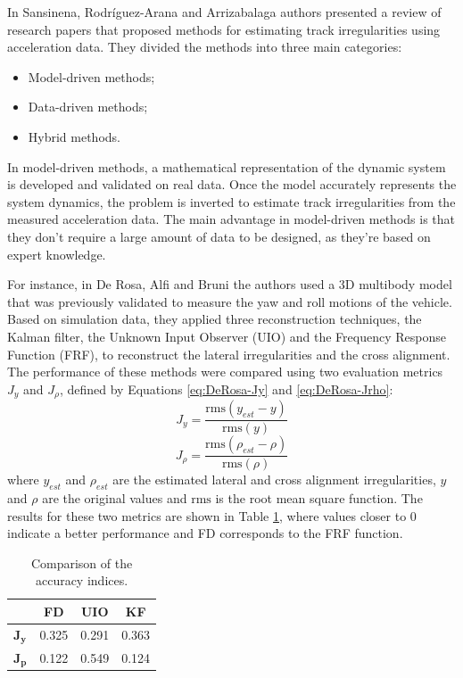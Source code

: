 In Sansinena, Rodríguez-Arana and Arrizabalaga \cite{Sansinena26032025} authors presented a review of research papers that proposed methods for estimating track irregularities using acceleration data. They divided the methods into three main categories:
\begin{itemize}
    \item Model-driven methods;
    \item Data-driven methods;
    \item Hybrid methods.
\end{itemize}

In model-driven methods, a mathematical representation of the dynamic system is developed and validated on real data. Once the model accurately represents the system dynamics, the problem is inverted to estimate track irregularities from the measured acceleration data. The main advantage in model-driven methods is that they don't require a large amount of data to be designed, as they're based on expert knowledge. 

For instance, in De Rosa, Alfi and Bruni \cite{DEROSA2019606} the authors used a 3D multibody model that was previously validated to measure the yaw and roll motions of the vehicle. Based on simulation data, they applied three reconstruction techniques, the Kalman filter, the Unknown Input Observer (UIO) and the Frequency Response Function (FRF), to reconstruct the lateral irregularities and the cross alignment. The performance of these methods were compared using two evaluation metrics $J_y$ and $J_\rho$, defined by Equations \ref{eq:DeRosa-Jy} and \ref{eq:DeRosa-Jrho}: 
\begin{equation}
    J_y = \frac{\text{rms}(y_{est} - y)}{\text{rms}(y)}
    \label{eq:DeRosa-Jy}
\end{equation} 
\begin{equation}
    J_\rho = \frac{\text{rms}(\rho_{est} - \rho)}{\text{rms}(\rho)}
    \label{eq:DeRosa-Jrho}
\end{equation}
where $y_{est}$ and $\rho_{est}$ are the estimated lateral and cross alignment irregularities, $y$ and $\rho$ are the original values and $\text{rms}$ is the root mean square function. The results for these two metrics are shown in Table \ref{tab:DeRosa_Results}, where values closer to 0 indicate a better performance and FD corresponds to the FRF function. 

\begin{table}[H]
\centering
\begin{tabular}{lccc}
    \hline
    & FD & UIO & KF \\
    \hline
    $\mathbf{J_y}$ & 0.325 & 0.291 & 0.363 \\
    $\mathbf{J_p}$ & 0.122 & 0.549 & 0.124 \\
    \hline
\end{tabular}
\caption{Comparison of the accuracy indices.}
\label{tab:DeRosa_Results}
\end{table}

